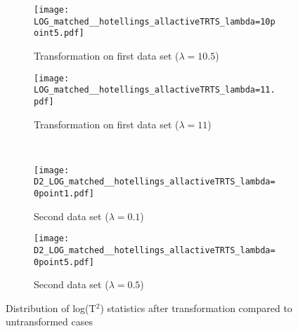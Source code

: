 \documentclass[11pt]{article}
\begin{document}
\begin{figure}[ht!]
  \begin{subfigure}[b]{0.425\linewidth}
  \centering
\texttt{[image: LOG\_matched\_\_hotellings\_allactiveTRTS\_lambda=10point5.pdf]}
\caption*{Transformation on first data set ($\lambda =10.5$)}
\vspace{1ex}
 \end{subfigure}%
  \begin{subfigure}[b]{0.425\linewidth}
  \centering
\texttt{[image: LOG\_matched\_\_hotellings\_allactiveTRTS\_lambda=11.pdf]}
\caption*{Transformation on first data set ($\lambda =11$)}
\vspace{1ex}
 \end{subfigure}%
 \\
   \begin{subfigure}[b]{0.425\linewidth}
  \centering
\texttt{[image: D2\_LOG\_matched\_\_hotellings\_allactiveTRTS\_lambda=0point1.pdf]}
\caption*{Second data set ($\lambda =0.1$)}
\vspace{1ex}
 \end{subfigure}%
  \begin{subfigure}[b]{0.425\linewidth}
  \centering
\texttt{[image: D2\_LOG\_matched\_\_hotellings\_allactiveTRTS\_lambda=0point5.pdf]}
\caption*{Second data set ($\lambda =0.5$)}
\vspace{1ex}
 \end{subfigure}%
\caption{Distribution of log(T$^2$) statistics after transformation compared to untransformed cases}
\label{distt10501log}
\end{figure}

\clearpage
\end{document}

